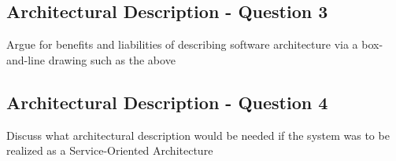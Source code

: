 
\subsection{Architectural Description - Question 3}

\begin{question}
Argue for benefits and liabilities of describing software
architecture via a box-and-line drawing such as the above
\end{question}


\subsection{Architectural Description - Question 4}

\begin{question}
Discuss what architectural description would be needed if
the system was to be realized as a Service-Oriented Architecture
\end{question}

